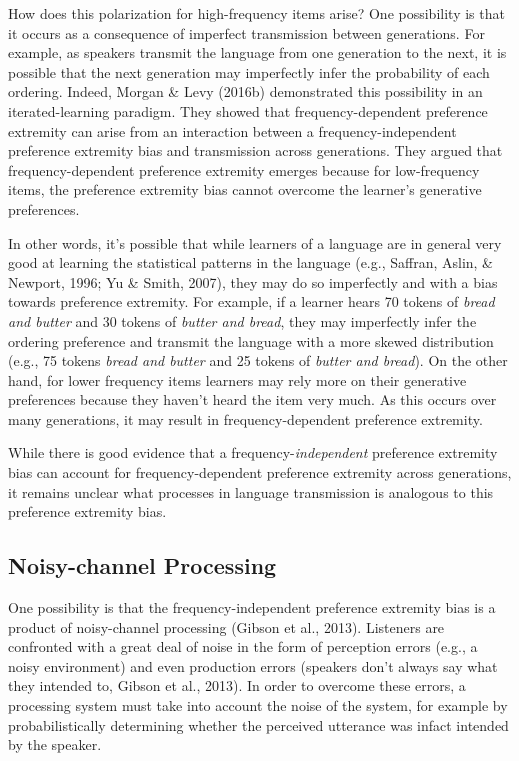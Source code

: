 \documentclass[10pt, letterpaper]{article}
\begin{document}
How does this polarization for high-frequency items arise? One
possibility is that it occurs as a consequence of imperfect transmission
between generations. For example, as speakers transmit the language from
one generation to the next, it is possible that the next generation may
imperfectly infer the probability of each ordering. Indeed, Morgan \&
Levy (2016b) demonstrated this possibility in an iterated-learning
paradigm. They showed that frequency-dependent preference extremity can
arise from an interaction between a frequency-independent preference
extremity bias and transmission across generations. They argued that
frequency-dependent preference extremity emerges because for
low-frequency items, the preference extremity bias cannot overcome the
learner's generative preferences.

In other words, it's possible that while learners of a language are in
general very good at learning the statistical patterns in the language
(e.g., Saffran, Aslin, \& Newport, 1996; Yu \& Smith, 2007), they may do
so imperfectly and with a bias towards preference extremity. For
example, if a learner hears 70 tokens of \emph{bread and butter} and 30
tokens of \emph{butter and bread}, they may imperfectly infer the
ordering preference and transmit the language with a more skewed
distribution (e.g., 75 tokens \emph{bread and butter} and 25 tokens of
\emph{butter and bread}). On the other hand, for lower frequency items
learners may rely more on their generative preferences because they
haven't heard the item very much. As this occurs over many generations,
it may result in frequency-dependent preference extremity.

While there is good evidence that a frequency-\emph{independent}
preference extremity bias can account for frequency-dependent preference
extremity across generations, it remains unclear what processes in
language transmission is analogous to this preference extremity bias.

\hypertarget{noisy-channel-processing}{%
\subsection{Noisy-channel Processing}\label{noisy-channel-processing}}

One possibility is that the frequency-independent preference extremity
bias is a product of noisy-channel processing (Gibson et al., 2013).
Listeners are confronted with a great deal of noise in the form of
perception errors (e.g., a noisy environment) and even production errors
(speakers don't always say what they intended to, Gibson et al., 2013).
In order to overcome these errors, a processing system must take into
account the noise of the system, for example by probabilistically
determining whether the perceived utterance was infact intended by the
speaker.
\end{document}
